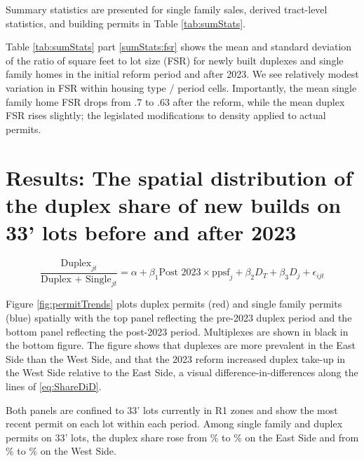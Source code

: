 \documentclass[12pt]{article}
\begin{document}
Summary statistics are presented for single family sales, derived tract-level statistics, and building permits in Table \ref{tab:sumStats}.

\begin{table}
	\centering
	\caption{\label{tab:sumStats}Summary statistics for variables from B.C. Assessment, City of Vancouver Permits, and derived}
	
\end{table}

Table \ref{tab:sumStats} part \ref{sumStats:fsr} shows the mean and standard deviation of the ratio of square feet to lot size (FSR) for newly built duplexes and single family homes in the initial reform period and after 2023. We see relatively modest variation in FSR within housing type / period cells. Importantly, the mean single family home FSR drops from .7 to .63 after the reform, while the mean duplex FSR rises slightly; the legislated modifications to density applied to actual permits. 

\section{\label{sec:results} Results: The spatial distribution of the duplex share of new builds on 33' lots before and after 2023}


\begin{equation}
	\label{eq:ShareDiD}
	\frac{\text{Duplex}_{jt}}{\text{Duplex + Single}_{jt}} = \alpha + \beta_{1} \text{Post 2023} \times \text{ppsf}_{j} + \beta_{2}D_{T} + \beta_{3}D_{j} + \epsilon_{ijt}
\end{equation}


Figure \ref{fig:permitTrends} plots duplex permits (red) and single family permits (blue) spatially with the top panel reflecting the pre-2023 duplex period and the bottom panel reflecting the post-2023 period. Multiplexes are shown in black in the bottom figure. The figure shows that duplexes are more prevalent in the East Side than the West Side, and that the 2023 reform increased duplex take-up in the West Side relative to the East Side, a visual difference-in-differences along the lines of \eqref{eq:ShareDiD}.

Both panels are confined to 33' lots currently in R1 zones and show the most recent permit on each lot within each period. Among single family and duplex permits on 33' lots, the duplex share rose from \dupVsSingleEastDuplexEra\% to \dupVsSingleEastRoneEra\% on the East Side and from \dupVsSingleWestDuplexEra\% to \dupVsSingleWestRoneEra\% on the West Side.
\end{document}
